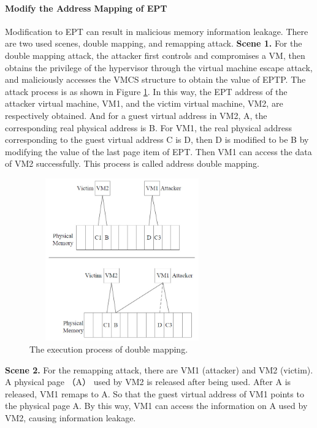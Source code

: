 \documentclass[conference]{IEEEtran}
\begin{document}
\paragraph{Modify the Address Mapping of EPT}
Modification to EPT can result in malicious memory information leakage. There are two used scenes, double mapping, and remapping attack.
\textbf{Scene 1.} 
For the double mapping attack, the attacker first controls and compromises a VM, then obtains the privilege of the hypervisor through the virtual machine escape attack, and maliciously accesses the VMCS structure to obtain the value of EPTP. The attack process is as shown in Figure \ref{fig0}. In this way, the EPT address of the attacker virtual machine, VM1, and the victim virtual machine, VM2, are respectively obtained. And for a guest virtual address in VM2, A, the corresponding real physical address is B. For VM1, the real physical address corresponding to the guest virtual address C is D, then D is modified to be B by modifying the value of the last page item of EPT. Then VM1 can access the data of VM2 successfully. This process is called address double mapping.
\begin{figure}
\centerline{\includegraphics[width=8cm, height=7cm]{VMCS0.jpg}}%
\caption{The execution process of double mapping. } \label{fig0}
\end{figure}
\textbf{Scene 2.}
For the remapping attack, there are VM1 (attacker) and VM2 (victim). A physical page （A） used by VM2 is released after being used. After A is released, VM1 remaps to A. So that the guest virtual address of VM1 points to the physical page A. By this way, VM1 can access the information on A used by VM2, causing information leakage.
\end{document}
